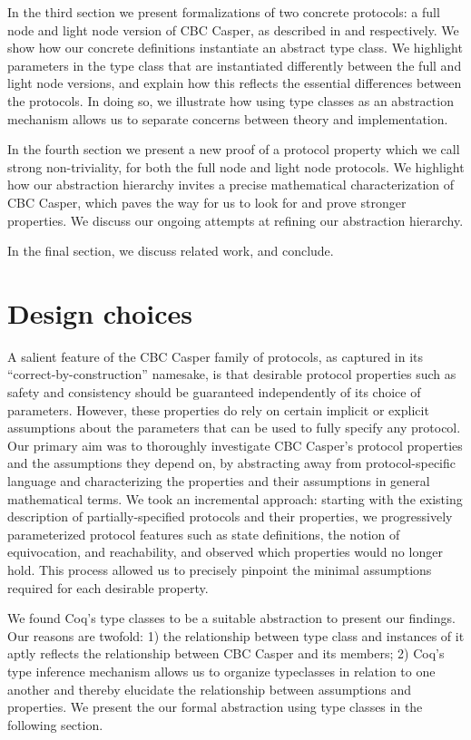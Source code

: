 \documentclass[runningheads]{llncs}
\begin{document}
In the third section we present formalizations of two concrete protocols: a full node and light node version of CBC Casper, as described in \cite{CBCfull} and \cite{CBClight} respectively. We show how our concrete definitions instantiate an abstract type class. We highlight parameters in the type class that are instantiated differently between the full and light node versions, and explain how this reflects the essential differences between the protocols. In doing so, we illustrate how using type classes as an abstraction mechanism allows us to separate concerns between theory and implementation.

In the fourth section we present a new proof of a protocol property which we call strong non-triviality, for both the full node and light node protocols. We highlight how our abstraction hierarchy invites a precise mathematical characterization of CBC Casper, which paves the way for us to look for and prove stronger properties. We discuss our ongoing attempts at refining our abstraction hierarchy.

In the final section, we discuss related work, and conclude.


\section{Design choices}
A salient feature of the CBC Casper family of protocols, as captured in its ``correct-by-construction'' namesake, is that desirable protocol properties such as safety and consistency should be guaranteed independently of its choice of parameters. However, these properties do rely on certain implicit or explicit assumptions about the parameters that can be used to fully specify any protocol. Our primary aim was to thoroughly investigate CBC Casper's protocol properties and the assumptions they depend on, by abstracting away from protocol-specific language and characterizing the properties and their assumptions in general mathematical terms. We took an incremental approach: starting with the existing description of partially-specified protocols and their properties, we progressively parameterized protocol features such as state definitions, the notion of equivocation, and reachability, and observed which properties would no longer hold. This process allowed us to precisely pinpoint the minimal assumptions required for each desirable property.

We found Coq's type classes to be a suitable abstraction to present our findings. Our reasons are twofold: 1) the relationship between type class and instances of it aptly reflects the relationship between CBC Casper and its members; 2) Coq's type inference mechanism allows us to organize typeclasses in relation to one another and thereby elucidate the relationship between assumptions and properties. We present the our formal abstraction using type classes in the following section.
\end{document}
